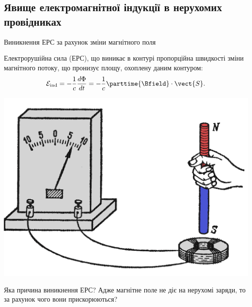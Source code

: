 \documentclass[onlytextwidth]{beamer}
\begin{document}
\subsection{Явище електромагнітної індукції в нерухомих провідниках}


\begin{frame}{Виникнення ЕРС за рахунок зміни магнітного поля}{}
	\begin{block}{}\justifying
		Електрорушійна сила (ЕРС), що виникає в контурі пропорційна швидкості зміни магнітного потоку, що пронизує площу, охоплену даним контуром:
		\begin{equation*}
			\mathcal{E}_\text{ind} =  -\frac1c \frac{d\Phi}{dt} = -\frac1c \parttime{\Bfield} \cdot \vect{S}.
		\end{equation*}
	\end{block}
	\begin{center}
		\begin{pict}
			\includegraphics[width=0.5\linewidth]{Field_change}
		\end{pict}
	\end{center}
	\begin{alertblock}{}
		Яка причина виникнення ЕРС? Адже магнітне поле не діє на нерухомі заряди, то за рахунок чого вони прискорюються?
	\end{alertblock}
\end{frame}
\end{document}

